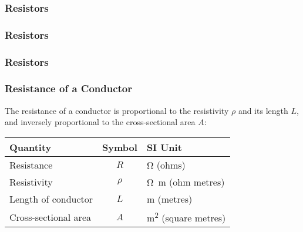 \documentclass[12pt,aspectratio=169]{beamer}
\newcommand{\pic}[2]{\texttt{[image: \#2]}}
\newcommand{\mb}[1]{\mathbf{#1}}
\newcommand{\eq}[2]{\vspace{#1}{\Large\begin{displaymath}#2\end{displaymath}}}
\begin{document}
\begin{frame}
  \frametitle{Resistors}
%
%  
%
\end{frame}


\begin{frame}
  \frametitle{Resistors}
\end{frame}


\begin{frame}
  \frametitle{Resistors}

\end{frame}


\begin{frame}
  \frametitle{Resistance of a Conductor}
  The resistance of a conductor is proportional to the resistivity $\rho$ and
  its length $L$, and inversely proportional to the cross-sectional area $A$:

  \eq{-.2in}{
    \boxed{R = \rho\frac{L}{A}}
  }

  \begin{center}
    \begin{tabular}{l|c|l}
      \rowcolor{pink}
      \textbf{Quantity} & \textbf{Symbol} & \textbf{SI Unit} \\ \hline
      Resistance           & $R$    & \si{\ohm} (ohms) \\
      Resistivity          & $\rho$ & \si{\ohm.\metre} (ohm metres) \\
      Length of conductor  & $L$    & \si{\metre} (metres) \\
      Cross-sectional area & $A$    & \si{\metre^2} (square metres) \\
    \end{tabular}
  \end{center}
\end{frame}
\end{document}
